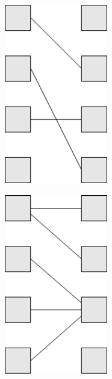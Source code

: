 \documentclass[11pt,twoside,a4paper]{report}
\begin{document}
\begin{figure}[H]
	\centering
	\begin{minipage}{0.3\textwidth}
		\vspace{-.5cm}
		\begin{center}
			\includegraphics[width=0.4\textwidth]{notacao8} %
			\label{fig:der51}
		\end{center}
	\end{minipage}%
	\begin{minipage}{0.3\textwidth}
		\begin{center}
			\includegraphics[width=0.4\textwidth]{notacao9} %

\end{center}
\end{minipage}
\end{figure}
\end{document}

